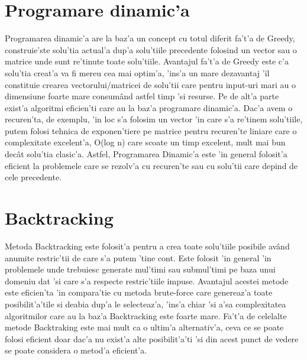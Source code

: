 \section{Programare dinamic'a}
\myindent
Programarea dinamic'a are la baz'a un concept cu totul diferit fa't'a de Greedy, construie'ste solu'tia actual'a dup'a solu'tiile precedente folosind un vector sau o matrice unde sunt re'tinute toate solu'tiile. Avantajul fa't'a de Greedy este c'a solu'tia creat'a va fi mereu cea mai optim'a, 'ins'a un mare dezavantaj 'il constituie crearea vectorului/matricei de solu'tii care pentru input-uri mari au o dimensiune foarte mare consum\^and astfel timp 'si resurse. Pe de alt'a parte exist'a algoritmi eficien'ti care au la baz'a programare dinamic'a. Dac'a avem o recuren'ta, de exemplu, 'in loc s'a folosim un vector 'in care s'a re'tinem solu'tiile, putem folosi tehnica de exponen'tiere pe matrice pentru recuren'te liniare care o complexitate excelent'a, O(log n) care scoate un timp excelent, mult mai bun dec\^at solu'tia clasic'a. Astfel, Programarea Dinamic'a este 'in general folosit'a eficient la problemele care se rezolv'a cu recuren'te sau cu solu'tii care depind de cele precedente.

\vspace{10mm}
\section{Backtracking}
\myindent
Metoda Backtracking este folosit'a pentru a crea toate solu'tiile posibile av\^and anumite restric'tii de care s'a putem 'tine cont. Este folosit 'in general 'in problemele unde trebuiesc generate mul'timi sau submul'timi pe baza unui domeniu dat 'si care s'a respecte restric'tiile impuse. Avantajul acestei metode este eficien'ta 'in compara'tie cu metoda brute-force care genereaz'a toate posibilit'a'tile si deabia dup'a le selecteaz'a, 'ins'a chiar 'si a'sa complexitatea algoritmilor care au la baz'a Backtracking este foarte mare. Fa't'a de celelalte metode Backtraking este mai mult ca o ultim'a alternativ'a, ceva ce se poate folosi eficient doar dac'a nu exist'a alte posibilit'a'ti 'si din acest punct de vedere se poate considera o metod'a eficient'a.